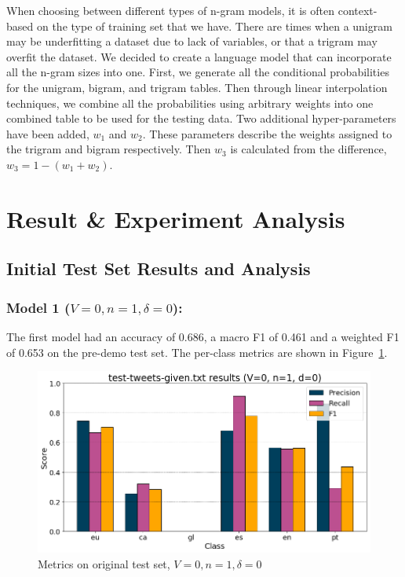 \documentclass[runningheads]{llncs}
\begin{document}
When choosing between different types of n-gram models, it is often context-based on the type of training set that we have. There are times when a unigram may be underfitting a dataset due to lack of variables, or that a trigram may overfit the dataset. We decided to create a language model that can incorporate all the n-gram sizes into one. First, we generate all the conditional probabilities for the unigram, bigram, and trigram tables. Then through linear interpolation techniques, we combine all the probabilities using arbitrary weights into one combined table to be used for the testing data. Two additional hyper-parameters have been added, $w_1$ and $w_2$. These parameters describe the weights assigned to the trigram and bigram respectively. Then $w_3$ is calculated from the difference, $w_3 = 1 - (w_1 + w_2).$

\newpage
\section{Result \& Experiment Analysis}

\subsection{Initial Test Set Results and Analysis}

\subsubsection{Model 1 ($V=0, n=1, \delta=0$): }
The first model had an accuracy of 0.686, a macro F1 of 0.461 and a weighted F1 of 0.653 on the pre-demo test set. The per-class metrics are shown in Figure~\ref{fig:pre_demo_0_1_0}. \\

\begin{figure}
    \begin{center}
        \includegraphics[width=12.5cm]{images/test_tweets_given_results_0_1_0.png}
        \caption{Metrics on original test set, $V=0, n=1, \delta=0$}
        \label{fig:pre_demo_0_1_0}
    \end{center}
\end{figure}
\end{document}
